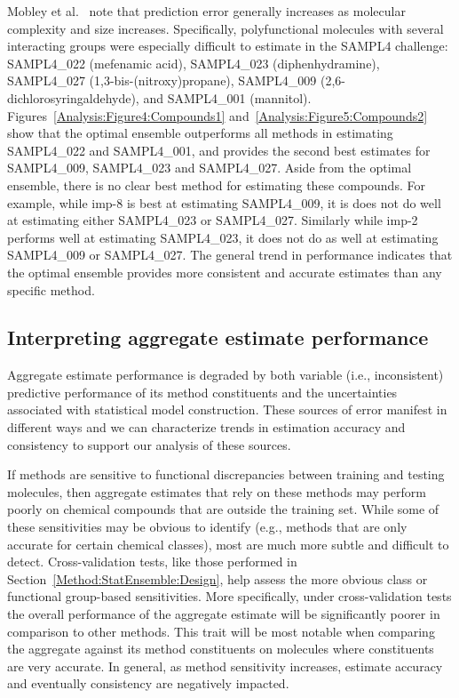 \documentclass[journal=jpcbfk, manuscript=article]{achemso}
\newcommand{\+}[1]{\ensuremath{\mathbf{#1}}}
\newcommand{\rev}[1]{#1}
\begin{document}
\rev{Mobley et al.~\cite{Mobley:2014} note that prediction error generally increases as molecular complexity and size increases.} 
Specifically, polyfunctional molecules with several interacting groups were especially difficult to estimate in the SAMPL4 challenge: SAMPL4\_022 (mefenamic acid), SAMPL4\_023 (diphenhydramine), SAMPL4\_027 (1,3-bis-(nitroxy)propane), SAMPL4\_009 (2,6-dichlorosyringaldehyde), and SAMPL4\_001 (mannitol). 
Figures~\ref{Analysis:Figure4:Compounds1} and~\ref{Analysis:Figure5:Compounds2} show that the optimal ensemble outperforms all methods in estimating SAMPL4\_022 and SAMPL4\_001, and provides the second best estimates for SAMPL4\_009, SAMPL4\_023 and SAMPL4\_027.
Aside from the optimal ensemble, there is no clear best method for estimating these compounds.
For example, while imp-8 is best at estimating SAMPL4\_009, it is does not do well at estimating either SAMPL4\_023 or SAMPL4\_027.
Similarly while imp-2 performs well at estimating SAMPL4\_023, it does not do as well at estimating SAMPL4\_009 or SAMPL4\_027.
The general trend in performance \rev{indicates} that the optimal ensemble provides more consistent and accurate estimates than any specific method. 

\subsection{\rev{Interpreting aggregate estimate performance}}
\rev{Aggregate estimate performance is degraded by both variable (i.e., inconsistent) predictive performance of its method constituents and the uncertainties associated with statistical model construction.
These sources of error manifest in different ways and we can characterize trends in estimation accuracy and consistency to support our analysis of these sources.}

\rev{If methods are sensitive to functional discrepancies between training and testing molecules, then aggregate estimates that rely on these methods may perform poorly on chemical  compounds that are outside the training set. 
While some of these sensitivities may be obvious to identify (e.g., methods that are only accurate for certain chemical classes), most are much more subtle and difficult to detect. 
Cross-validation tests, like those performed in Section~\ref{Method:StatEnsemble:Design}, help assess the more obvious class or functional group-based sensitivities.
More specifically, under cross-validation tests the overall performance of the aggregate estimate will be significantly poorer in comparison to other methods. 
This trait will be most notable when comparing the aggregate against its method constituents on molecules where constituents are very accurate.
In general, as method sensitivity increases, estimate accuracy and eventually consistency are negatively impacted.}
\end{document}
